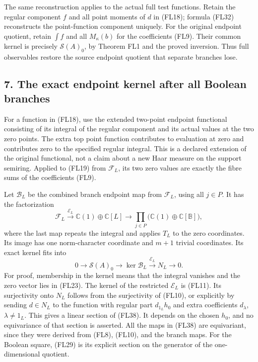 \documentclass[
  10pt,
]{article}
\begin{document}
The same reconstruction applies to the actual full test functions.
Retain the regular component \(f\) and all point moments of \(d\) in
(FL18); formula (FL32) reconstructs the point-function component
uniquely. For the original endpoint quotient, retain \(\int f\) and all
\(M_\kappa(b)\) for the coefficients (FL9). Their common kernel is
precisely \(\mathcal S(A)_0\), by Theorem FL1 and the proved inversion.
Thus full observables restore the source endpoint quotient that separate
branches lose.

\subsection{7. The exact endpoint kernel after all Boolean
branches}\label{the-exact-endpoint-kernel-after-all-boolean-branches}

For a function in (FL18), use the extended two-point endpoint functional
consisting of its integral of the regular component and its actual
values at the two zero points. The extra top point function contributes
to evaluation at zero and contributes zero to the specified regular
integral. This is a declared extension of the original functional, not a
claim about a new Haar measure on the support semiring. Applied to
(FL19) from \(\mathcal F_L\), its two zero values are exactly the fibre
sums of the coefficients (FL9).

Let \(\mathcal B_L\) be the combined branch endpoint map from
\(\mathcal F_L\), using all \(j\in P\). It has the factorization \[
\mathcal F_L\xrightarrow{\mathcal E_L}
\mathbb C(1)\oplus\mathbb C[L]
\longrightarrow\prod_{j\in P}
\bigl(\mathbb C(1)\oplus\mathbb C[\mathbb B]\bigr),
\tag{FL37}
\] where the last map repeats the integral and applies \(T_L\) to the
zero coordinates. Its image has one norm-character coordinate and
\(m+1\) trivial coordinates. Its exact kernel fits into \[
0\to\mathcal S(A)_0\longrightarrow\ker\mathcal B_L
\xrightarrow{\mathcal E_L}N_L\to0.
\tag{FL38}
\] For proof, membership in the kernel means that the integral vanishes
and the zero vector lies in (FL23). The kernel of the restricted
\(\mathcal E_L\) is (FL11). Its surjectivity onto \(N_L\) follows from
the surjectivity of (FL10), or explicitly by sending \(d\in N_L\) to the
function with regular part \(d_{1_L}h_0\) and extra coefficients
\(d_\lambda\), \(\lambda\ne1_L\). This gives a linear section of (FL38).
It depends on the chosen \(h_0\), and no equivariance of that section is
asserted. All the maps in (FL38) are equivariant, since they were
derived from (FL8), (FL10), and the branch maps. For the Boolean square,
(FL29) is its explicit section on the generator of the one-dimensional
quotient.
\end{document}

